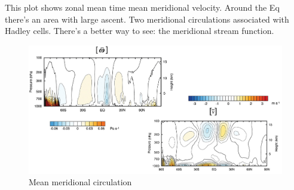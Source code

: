 This plot shows zonal mean time mean meridional velocity. Around the Eq there’s an area with large ascent. Two meridional circulations associated with Hadley cells. There’s a better way to see: the meridional stream function. 
\begin{figure}[htpb]
    \centering
    \includegraphics[width=0.5\linewidth]{uploads/mean meridional circulation.png}
    \caption{Mean meridional circulation}
    \label{fig:mean meridional circ}
\end{figure}
